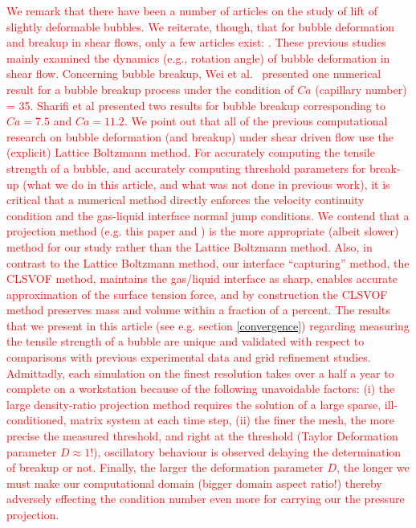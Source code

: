 \documentclass{elsarticle}
\begin{document}
\par
\textcolor{red} {
We remark that there have been a number of articles on the study of lift of slightly deformable bubbles\cite{ErvinANDTryggvason1997,legendre1998lift}.  We reiterate, though, that for bubble deformation and breakup in shear flows, only a few articles exist: \cite{WeiQiaXu12,WanShiZha15,AAMM-16-2}.  These previous studies mainly examined the dynamics (e.g., rotation angle) of bubble deformation in shear flow.  Concerning bubble breakup, Wei et al.~\cite{WeiQiaXu12} presented one numerical result for a bubble breakup process under the condition of $Ca$ (capillary number) = 35. Sharifi et al\cite{AAMM-16-2} presented two results for bubble breakup corresponding to $Ca=7.5$ and $Ca=11.2$.  We point out that all of the previous computational research on bubble deformation (and breakup) under shear driven flow\cite{WeiQiaXu12,WanShiZha15,AAMM-16-2} use the (explicit) Lattice Boltzmann method.  For accurately computing the tensile strength of a bubble, and accurately computing threshold parameters for break-up (what we do in this article, and what was not done in previous work), it is critical that a numerical method directly enforces the velocity continuity condition and the gas-liquid interface normal jump conditions.  We contend that a projection method (e.g. this paper and \cite{zhang2021three,zhang2022three,OhtSus12}) is the more appropriate (albeit slower) method for our study rather than the Lattice Boltzmann method.  Also, in contrast to the Lattice Boltzmann method, our interface ``capturing'' method, the CLSVOF method\cite{SusPuc00,SusSmiHusOhtZhi07}, maintains the gas/liquid interface as sharp, enables accurate approximation of the surface tension force,  and by construction the CLSVOF method preserves mass and volume within a fraction of a percent. The results that we present in this article (see e.g. section \ref{convergence}) regarding measuring the tensile strength of a bubble are unique and validated with respect to comparisons with previous experimental data and grid refinement studies.  Admittadly, each simulation on the finest resolution takes over a half a year to complete on a workstation because of the following unavoidable factors: (i) the large density-ratio projection method requires the solution of a large sparse, ill-conditioned, matrix system at each time step, (ii) the finer the mesh, the more precise the measured threshold, and right at the threshold (Taylor Deformation parameter $D\approx 1$!), oscillatory behaviour is observed delaying the determination of breakup or not.  Finally, the larger the deformation parameter $D$, the longer we must make our computational domain (bigger domain aspect ratio!) thereby adversely effecting the condition number even more for carrying our the pressure projection. 
}
\end{document}
